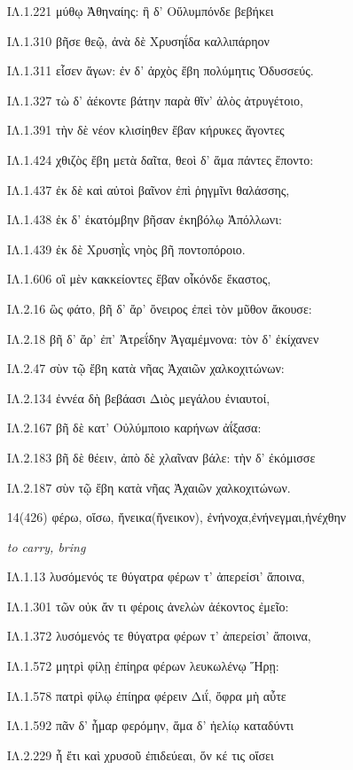 \begin{enumerate}
{ΙΛ.1.221 μύθῳ Ἀθηναίης: ἣ δ' Οὔλυμπόνδε βεβήκει

ΙΛ.1.310 βῆσε θεῷ, ἀνὰ δὲ Χρυσηΐδα καλλιπάρηον

ΙΛ.1.311 εἷσεν ἄγων: ἐν δ' ἀρχὸς ἔβη πολύμητις Ὀδυσσεύς.

ΙΛ.1.327 τὼ δ' ἀέκοντε βάτην παρὰ θῖν' ἁλὸς ἀτρυγέτοιο,

ΙΛ.1.391 τὴν δὲ νέον κλισίηθεν ἔβαν κήρυκες ἄγοντες

ΙΛ.1.424 χθιζὸς ἔβη μετὰ δαῖτα, θεοὶ δ' ἅμα πάντες ἕποντο:

ΙΛ.1.437 ἐκ δὲ καὶ αὐτοὶ βαῖνον ἐπὶ ῥηγμῖνι θαλάσσης,

ΙΛ.1.438 ἐκ δ' ἑκατόμβην βῆσαν ἑκηβόλῳ Ἀπόλλωνι:

ΙΛ.1.439 ἐκ δὲ Χρυσηῒς νηὸς βῆ ποντοπόροιο.

ΙΛ.1.606 οἳ μὲν κακκείοντες ἔβαν οἶκόνδε ἕκαστος,

ΙΛ.2.16 ὣς φάτο, βῆ δ' ἄρ' ὄνειρος ἐπεὶ τὸν μῦθον ἄκουσε:

ΙΛ.2.18 βῆ δ' ἄρ' ἐπ' Ἀτρεΐδην Ἀγαμέμνονα: τὸν δ' ἐκίχανεν

ΙΛ.2.47 σὺν τῷ ἔβη κατὰ νῆας Ἀχαιῶν χαλκοχιτώνων:

ΙΛ.2.134 ἐννέα δὴ βεβάασι Διὸς μεγάλου ἐνιαυτοί,

ΙΛ.2.167 βῆ δὲ κατ' Οὐλύμποιο καρήνων ἀΐξασα:

ΙΛ.2.183 βῆ δὲ θέειν, ἀπὸ δὲ χλαῖναν βάλε: τὴν δ' ἐκόμισσε

ΙΛ.2.187 σὺν τῷ ἔβη κατὰ νῆας Ἀχαιῶν χαλκοχιτώνων.

}

\clearpage
\item[\large 14(426)]{\large \g φέρω, οἴσω, ἤνεικα(ἤνεικον), ἐνήνοχα,ἐνήνεγμαι,ἠνέχθην  }

\hspace{0.2cm} \textit{  to carry, bring }

{\g
ΙΛ.1.13 λυσόμενός τε θύγατρα φέρων τ' ἀπερείσι' ἄποινα,

ΙΛ.1.301 τῶν οὐκ ἄν τι φέροις ἀνελὼν ἀέκοντος ἐμεῖο:

ΙΛ.1.372 λυσόμενός τε θύγατρα φέρων τ' ἀπερείσι' ἄποινα,

ΙΛ.1.572 μητρὶ φίλῃ ἐπίηρα φέρων λευκωλένῳ Ἥρῃ:

ΙΛ.1.578 πατρὶ φίλῳ ἐπίηρα φέρειν Διΐ, ὄφρα μὴ αὖτε

ΙΛ.1.592 πᾶν δ' ἦμαρ φερόμην, ἅμα δ' ἠελίῳ καταδύντι

ΙΛ.2.229 ἦ ἔτι καὶ χρυσοῦ ἐπιδεύεαι, ὅν κέ τις οἴσει

}
\end{enumerate}
